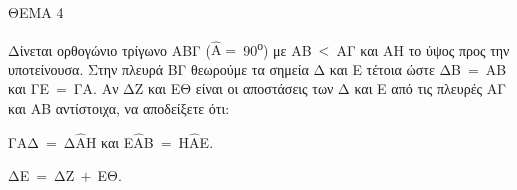 
ΘΕΜΑ 4

Δίνεται ορθογώνιο τρίγωνο ΑΒΓ ($\widehat{\text{Α}} = \ $90\textsuperscript{ο}) με ΑΒ$\  < \ $ΑΓ και ΑΗ το ύψος προς την υποτείνουσα. Στην πλευρά ΒΓ θεωρούμε τα σημεία Δ και Ε τέτοια ώστε ΔΒ$\  = \ $ΑΒ και ΓΕ$\  = \ $ΓΑ. Αν ΔΖ και ΕΘ είναι οι αποστάσεις των Δ και Ε από τις πλευρές ΑΓ και ΑΒ αντίστοιχα, να αποδείξετε ότι:

\begin{alist}
\item Γ$\widehat{\text{Α}}$Δ$\  = \ $Δ$\widehat{\text{Α}}$Η και Ε$\widehat{\text{Α}}$Β$\  = \ $Η$\widehat{\text{Α}}$Ε.


\item ΔΕ$\  = \ $ΔΖ$\  + \ $ΕΘ.

\end{alist}
